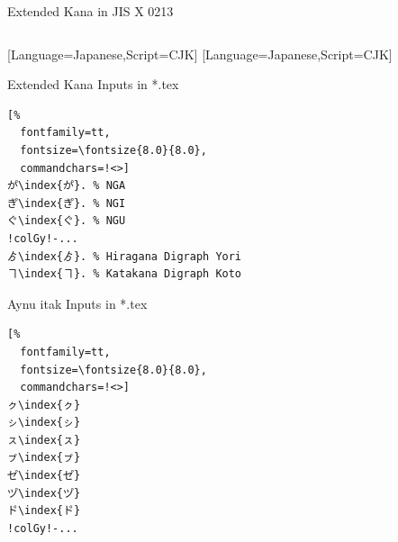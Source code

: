 \documentclass[aspectratio=169,10pt]{beamer}
\begin{document}
\begin{frame}[fragile]{Extended Kana in JIS X 0213}

\begin{columns}
\begin{column}{55mm}

\setmonofont{Noto Sans Mono CJK JP}[Language=Japanese,Script=CJK]
\setsansfont{Noto Sans CJK JP}[Language=Japanese,Script=CJK]
\begin{exampleblock}{Extended Kana Inputs in *.tex}
\begin{Verbatim}[%
  fontfamily=tt,
  fontsize=\fontsize{8.0}{8.0},
  commandchars=!<>]
か゚\index{か゚}. % NGA
き゚\index{き゚}. % NGI
く゚\index{く゚}. % NGU
!colGy!-...
ゟ\index{ゟ}. % Hiragana Digraph Yori
ヿ\index{ヿ}. % Katakana Digraph Koto
\end{Verbatim}
\end{exampleblock}

\begin{exampleblock}{Aynu itak Inputs in *.tex}
\begin{Verbatim}[%
  fontfamily=tt,
  fontsize=\fontsize{8.0}{8.0},
  commandchars=!<>]
ㇰ\index{ㇰ}
ㇱ\index{ㇱ}
ㇲ\index{ㇲ}
ㇷ゚\index{ㇷ゚}
セ゚\index{セ゚}
ツ゚\index{ツ゚}
ト゚\index{ト゚}
!colGy!-...
\end{Verbatim}
\end{exampleblock}
\end{column}



\begin{column}{38mm}
\begin{center}
\end{center}
\end{column}

\begin{column}{38mm}
\begin{center}
\end{center}
\end{column}
\end{columns}

\end{frame}

\end{document}
